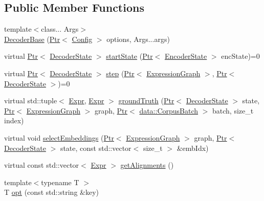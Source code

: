 \subsection*{Public Member Functions}
\begin{DoxyCompactItemize}
\item 
{\footnotesize template$<$class... Args$>$ }\\\hyperlink{classmarian_1_1DecoderBase_a85b857fc8ff57bbd1608efaa4cf5765e}{Decoder\+Base} (\hyperlink{namespacemarian_ad1a373be43a00ef9ce35666145137b08}{Ptr}$<$ \hyperlink{classmarian_1_1Config}{Config} $>$ options, Args...\+args)
\item 
virtual \hyperlink{namespacemarian_ad1a373be43a00ef9ce35666145137b08}{Ptr}$<$ \hyperlink{classmarian_1_1DecoderState}{Decoder\+State} $>$ \hyperlink{classmarian_1_1DecoderBase_a26b37dc5cebf21cea9e1f8b5ef5c8040}{start\+State} (\hyperlink{namespacemarian_ad1a373be43a00ef9ce35666145137b08}{Ptr}$<$ \hyperlink{classmarian_1_1EncoderState}{Encoder\+State} $>$ enc\+State)=0
\item 
virtual \hyperlink{namespacemarian_ad1a373be43a00ef9ce35666145137b08}{Ptr}$<$ \hyperlink{classmarian_1_1DecoderState}{Decoder\+State} $>$ \hyperlink{classmarian_1_1DecoderBase_a7d4f658f7b33660948f5a960ba667a4b}{step} (\hyperlink{namespacemarian_ad1a373be43a00ef9ce35666145137b08}{Ptr}$<$ \hyperlink{classmarian_1_1ExpressionGraph}{Expression\+Graph} $>$, \hyperlink{namespacemarian_ad1a373be43a00ef9ce35666145137b08}{Ptr}$<$ \hyperlink{classmarian_1_1DecoderState}{Decoder\+State} $>$)=0
\item 
virtual std\+::tuple$<$ \hyperlink{namespacemarian_a498d8baf75b754011078b890b39c8e12}{Expr}, \hyperlink{namespacemarian_a498d8baf75b754011078b890b39c8e12}{Expr} $>$ \hyperlink{classmarian_1_1DecoderBase_a6b202f7578740e5f6045e15883bcd1ac}{ground\+Truth} (\hyperlink{namespacemarian_ad1a373be43a00ef9ce35666145137b08}{Ptr}$<$ \hyperlink{classmarian_1_1DecoderState}{Decoder\+State} $>$ state, \hyperlink{namespacemarian_ad1a373be43a00ef9ce35666145137b08}{Ptr}$<$ \hyperlink{classmarian_1_1ExpressionGraph}{Expression\+Graph} $>$ graph, \hyperlink{namespacemarian_ad1a373be43a00ef9ce35666145137b08}{Ptr}$<$ \hyperlink{classmarian_1_1data_1_1CorpusBatch}{data\+::\+Corpus\+Batch} $>$ batch, size\+\_\+t index)
\item 
virtual void \hyperlink{classmarian_1_1DecoderBase_aedde227a468dd3d8aa9e94c558d4bd2f}{select\+Embeddings} (\hyperlink{namespacemarian_ad1a373be43a00ef9ce35666145137b08}{Ptr}$<$ \hyperlink{classmarian_1_1ExpressionGraph}{Expression\+Graph} $>$ graph, \hyperlink{namespacemarian_ad1a373be43a00ef9ce35666145137b08}{Ptr}$<$ \hyperlink{classmarian_1_1DecoderState}{Decoder\+State} $>$ state, const std\+::vector$<$ size\+\_\+t $>$ \&emb\+Idx)
\item 
virtual const std\+::vector$<$ \hyperlink{namespacemarian_a498d8baf75b754011078b890b39c8e12}{Expr} $>$ \hyperlink{classmarian_1_1DecoderBase_af80f32ecf263ae43bbddd7401e57b472}{get\+Alignments} ()
\item 
{\footnotesize template$<$typename T $>$ }\\T \hyperlink{classmarian_1_1DecoderBase_a209c8008d630b930df852cd7939f98a7}{opt} (const std\+::string \&key)
\end{DoxyCompactItemize}
